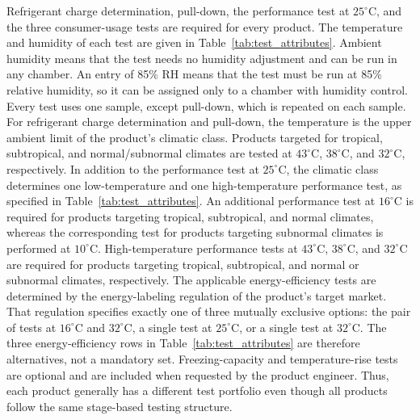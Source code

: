 Refrigerant charge determination, pull-down, the performance test at
\(25^\circ\mathrm{C}\), and the three consumer-usage tests are required
for every product.
The temperature and humidity of each test are given in
Table~\ref{tab:test_attributes}.
Ambient humidity means that the test needs no humidity adjustment and
can be run in any chamber.
An entry of 85\% RH means that the test must be run at 85\% relative
humidity, so it can be assigned only to a chamber with humidity control.
Every test uses one sample, except pull-down, which is repeated on each
sample.
For refrigerant charge determination and pull-down, the temperature is
the upper ambient limit of the product's climatic class.
Products targeted for tropical, subtropical, and normal/subnormal
climates are tested at \(43^\circ\mathrm{C}\), \(38^\circ\mathrm{C}\),
and \(32^\circ\mathrm{C}\), respectively.
In addition to the performance test at \(25^\circ\mathrm{C}\), the
climatic class determines one low-temperature and one high-temperature
performance test, as specified in Table~\ref{tab:test_attributes}.
An additional performance test at \(16^\circ\mathrm{C}\) is required for
products targeting tropical, subtropical, and normal climates, whereas
the corresponding test for products targeting subnormal climates is
performed at \(10^\circ\mathrm{C}\).
High-temperature performance tests at \(43^\circ\mathrm{C}\),
\(38^\circ\mathrm{C}\), and \(32^\circ\mathrm{C}\) are required for
products targeting tropical, subtropical, and normal or subnormal
climates, respectively.
The applicable energy-efficiency tests are determined by the
energy-labeling regulation of the product's target market.
That regulation specifies exactly one of three mutually exclusive
options: the pair of tests at \(16^\circ\mathrm{C}\) and
\(32^\circ\mathrm{C}\), a single test at \(25^\circ\mathrm{C}\), or a
single test at \(32^\circ\mathrm{C}\).
The three energy-efficiency rows in Table~\ref{tab:test_attributes} are
therefore alternatives, not a mandatory set.
Freezing-capacity and temperature-rise tests are optional and are
included when requested by the product engineer.
Thus, each product generally has a different test portfolio even though
all products follow the same stage-based testing structure.

